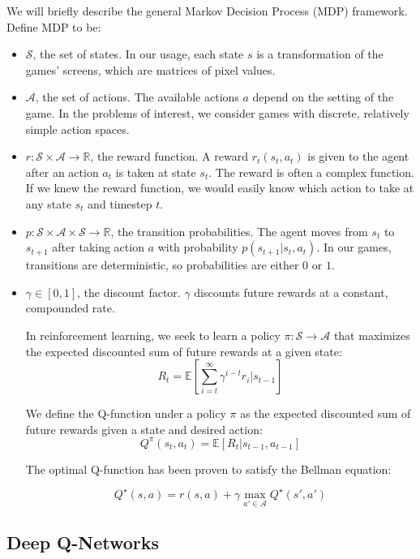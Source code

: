 \documentclass[11pt]{article}
\begin{document}
We will briefly describe the general Markov Decision Process (MDP)
framework. Define MDP to be:

\begin{itemize}
\item $\mathcal{S}$, the set of states. In our usage, each state $s$
is a transformation of the games' screens, which are matrices of pixel
values.
  
\item $\mathcal{A}$, the set of actions. The available actions $a$
depend on the setting of the game. In the problems of interest, we
consider games with discrete, relatively simple action spaces.
  
\item $r: \mathcal{S} \times \mathcal{A} \to \mathbb{R}$, the reward
function. A reward $r_t(s_t, a_t)$ is given to the agent after an
action $a_t$ is taken at state $s_t$. The reward is often a complex
function. If we knew the reward function, we would easily know which
action to take at any state $s_t$ and timestep $t$.
  
\item $p: \mathcal{S} \times \mathcal{A} \times \mathcal{S} \to
\mathbb{R}$, the transition probabilities. The agent moves from $s_t$
to $s_{t+1}$ after taking action $a$ with probability $p(s_{t+1} |s_t,
a_t)$. In our games, transitions are deterministic, so probabilities
are either $0$ or $1$.
  
\item $\gamma \in [0, 1]$, the discount factor. $\gamma$ discounts
  future rewards at a constant, compounded rate.

  In reinforcement learning, we seek to learn a policy
  $\pi: \mathcal{S} \to \mathcal{A}$ that maximizes the expected
  discounted sum of future rewards at a given
  state:
  $$R_t = \mathbb{E}\left[\sum_{i=t}^\infty \gamma^{i-t} r_{i}|s_{t-1}\right]$$

  We define the Q-function under a policy $\pi$ as the expected
  discounted sum of future rewards given a state and desired action:
  $$Q^\pi(s_t, a_t) = \mathbb{E}\left[R_t | s_{t-1}, a_{t-1} \right]$$

  The optimal Q-function has been proven to satisfy the Bellman equation:

  $$Q^\star (s, a) = r(s, a) + \gamma \max_{a' \in \mathcal{A}} Q^\star(s', a')$$
\end{itemize}


\subsection{Deep Q-Networks}
\end{document}

